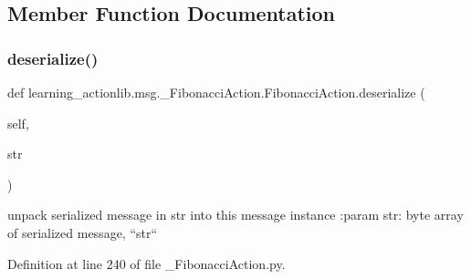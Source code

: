 \subsection{Member Function Documentation}
\mbox{\label{classlearning__actionlib_1_1msg_1_1__FibonacciAction_1_1FibonacciAction_a1adabc6fa0d4fd3e3402e1a461024898}} 
\subsubsection{\texorpdfstring{deserialize()}{deserialize()}}
{\footnotesize\ttfamily def learning\+\_\+actionlib.\+msg.\+\_\+\+Fibonacci\+Action.\+Fibonacci\+Action.\+deserialize (\begin{DoxyParamCaption}\item[{}]{self,  }\item[{}]{str }\end{DoxyParamCaption})}

\begin{DoxyVerb}unpack serialized message in str into this message instance
:param str: byte array of serialized message, ``str``
\end{DoxyVerb}
 

Definition at line 240 of file \+\_\+\+Fibonacci\+Action.\+py.



